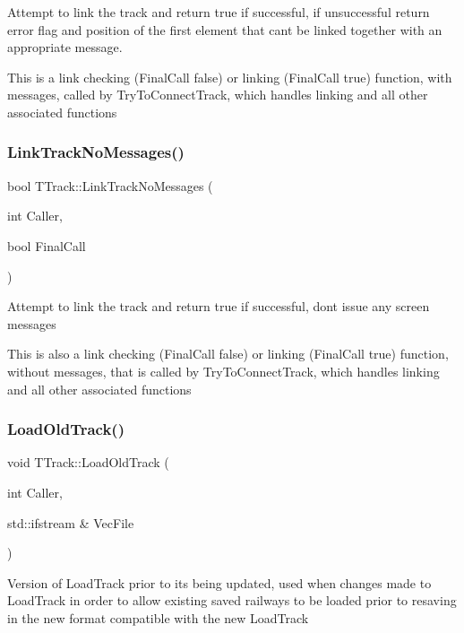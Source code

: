 Attempt to link the track and return true if successful, if unsuccessful return error flag and position of the first element that can\textquotesingle{}t be linked together with an appropriate message.

This is a link checking (Final\+Call false) or linking (Final\+Call true) function, with messages, called by Try\+To\+Connect\+Track, which handles linking and all other associated functions \mbox{\label{class_t_track_a42f410832651458a4a34769ef95be51b}} 
\subsubsection{\texorpdfstring{Link\+Track\+No\+Messages()}{LinkTrackNoMessages()}}
{\footnotesize\ttfamily bool T\+Track\+::\+Link\+Track\+No\+Messages (\begin{DoxyParamCaption}\item[{int}]{Caller,  }\item[{bool}]{Final\+Call }\end{DoxyParamCaption})}

Attempt to link the track and return true if successful, don\textquotesingle{}t issue any screen messages

This is also a link checking (Final\+Call false) or linking (Final\+Call true) function, without messages, that is called by Try\+To\+Connect\+Track, which handles linking and all other associated functions \mbox{\label{class_t_track_abff18c1d577e257279c816da8868f232}} 
\subsubsection{\texorpdfstring{Load\+Old\+Track()}{LoadOldTrack()}}
{\footnotesize\ttfamily void T\+Track\+::\+Load\+Old\+Track (\begin{DoxyParamCaption}\item[{int}]{Caller,  }\item[{std\+::ifstream \&}]{Vec\+File }\end{DoxyParamCaption})}

Version of Load\+Track prior to its being updated, used when changes made to Load\+Track in order to allow existing saved railways to be loaded prior to resaving in the new format compatible with the new Load\+Track \mbox{\label{class_t_track_aa60a7460b2d95189e8de3817e4ad21f2}} 
